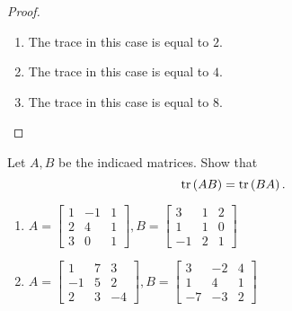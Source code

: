 \begin{proof}
    \begin{enumerate}[label={(\alph*)}]
        \item The trace in this case is equal to $2$.
        \item The trace in this case is equal to $4$.
        \item The trace in this case is equal to $8$.
    \end{enumerate}
\end{proof}

\begin{exercise}
    Let $A, B$ be the indicaed matrices. Show that
    \[
        \text{tr}\left({AB}\right) = \text{tr}\left({BA}\right).
    \]
    \begin{enumerate}[label={(\alph*)}]
        \item $A = \begin{bmatrix}1 & -1 & 1 \\ 2 & 4 & 1 \\ 3 & 0 & 1\end{bmatrix}, B = \begin{bmatrix}3 & 1 & 2 \\ 1 & 1 & 0 \\ -1 & 2 & 1\end{bmatrix}$
        \item $A = \begin{bmatrix}1 & 7 & 3 \\ -1 & 5 & 2 \\ 2 & 3 & -4\end{bmatrix}, B = \begin{bmatrix}3 & -2 & 4 \\ 1 & 4 & 1 \\ -7 & -3 & 2\end{bmatrix}$
    \end{enumerate}
\end{exercise}

